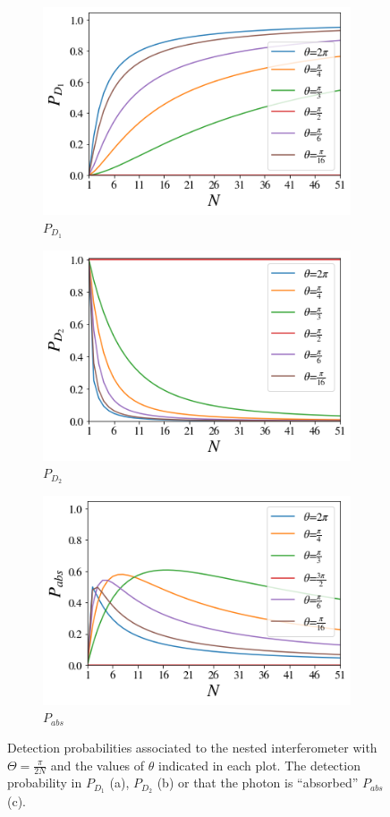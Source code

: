 \documentclass[12pt]{book}
\begin{document}
 \begin{figure}[t]
\centering
\begin{subfigure}[b]{0.45\linewidth}
\includegraphics[width=\linewidth,height=5 cm]{images/BS_Azuna.png}
\caption{$P_{D_{1}}$}

\end{subfigure}
\begin{subfigure}[b]{0.45\linewidth}
\includegraphics[width=\linewidth,height=5 cm]{images/BS_AzunaD2.png}
\caption{$P_{D_{2}}$}
\label{fig:westminster_aerea}
\end{subfigure}
\begin{subfigure}[b]{0.45\linewidth}
\includegraphics[width=\linewidth,height=5 cm]{images/absorbido_azuna.png}
\caption{$P_{abs}$}
\label{fig:BS1}
\end{subfigure}
\caption{Detection probabilities associated to the nested interferometer with $\Theta=\frac{\pi}{2N}$ and the values of $\theta$ indicated in each plot. The detection probability in $P_{D_{1}}$ (a), $P_{D_{2}}$ (b) or that the photon is ``absorbed'' $P_{abs}$ (c). }
\label{Azuma1}
\end{figure}
\end{document}
